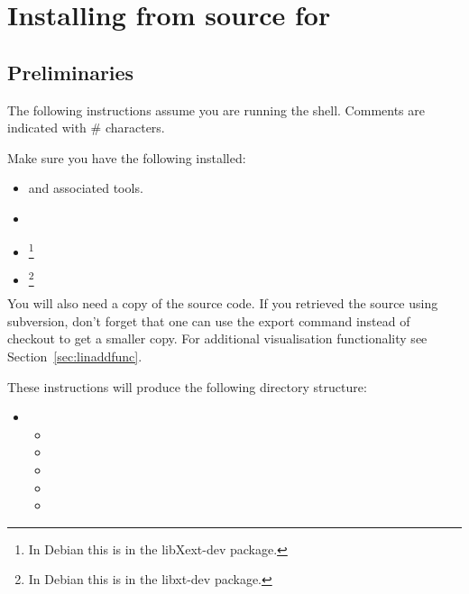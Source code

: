 
%
%
%

\section{Installing from source for \linux}
\label{sec:srclinux}

\subsection{Preliminaries}

The following instructions assume you are running the  shell.
Comments are indicated with \# characters.

Make sure you have the following installed:
\begin{itemize}
 \item {} and associated tools.
 \item {}
 \item {}\footnote{In Debian this is in the libXext-dev package.}
 \item {}\footnote{In Debian this is in the libxt-dev package.}
\end{itemize}

You will also need a copy of the \esfinley source code.
If you retrieved the source using subversion, don't forget that one can use the export command instead of checkout to get a smaller copy.
For additional visualisation functionality see Section~\ref{sec:linaddfunc}.

These instructions will produce the following directory structure:
\begin{itemize}
 \item[]  \begin{itemize}
  \item[] 
  \item[] 
  \item[] 
  \item[] 
  \item[] 
 \end{itemize}
\end{itemize}

